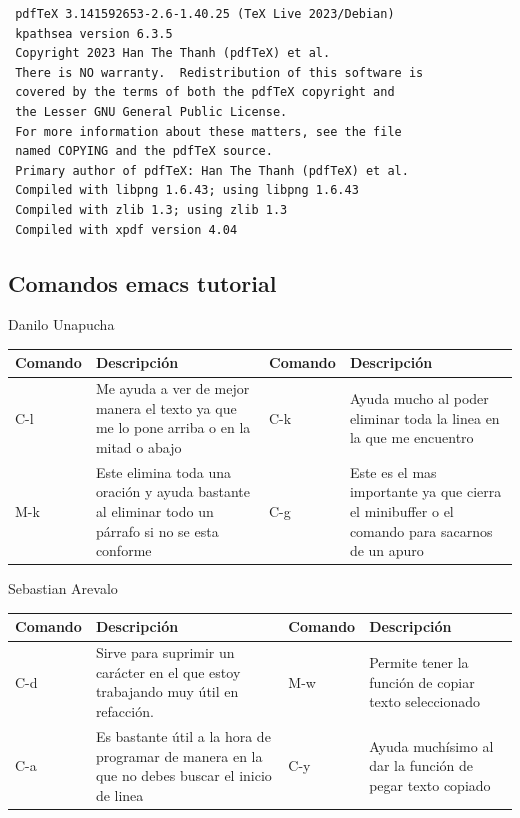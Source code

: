 \documentclass[11pt]{article}
\begin{document}
\begin{enumerate}
\begin{verbatim}
 pdfTeX 3.141592653-2.6-1.40.25 (TeX Live 2023/Debian)
 kpathsea version 6.3.5
 Copyright 2023 Han The Thanh (pdfTeX) et al.
 There is NO warranty.  Redistribution of this software is
 covered by the terms of both the pdfTeX copyright and
 the Lesser GNU General Public License.
 For more information about these matters, see the file
 named COPYING and the pdfTeX source.
 Primary author of pdfTeX: Han The Thanh (pdfTeX) et al.
 Compiled with libpng 1.6.43; using libpng 1.6.43
 Compiled with zlib 1.3; using zlib 1.3
 Compiled with xpdf version 4.04
\end{verbatim}
\end{enumerate}

\subsection{Comandos emacs tutorial}
\label{sec:org5b925f7}
Danilo Unapucha
\begin{center}
\begin{tabular}{llll}
Comando & Descripción & Comando & Descripción\\[0pt]
\hline
C-l & Me ayuda a ver de mejor manera el texto ya que me lo pone arriba o en la mitad o abajo & C-k & Ayuda mucho al poder eliminar toda la linea en la que me encuentro\\[0pt]
M-k & Este elimina toda una oración y ayuda bastante al eliminar todo un párrafo si no se esta conforme & C-g & Este es el mas importante ya que cierra el minibuffer o el comando para sacarnos de un apuro\\[0pt]
\end{tabular}
\end{center}

Sebastian Arevalo
\begin{center}
\begin{tabular}{llll}
Comando & Descripción & Comando & Descripción\\[0pt]
\hline
C-d & Sirve para suprimir un carácter en el que estoy trabajando muy útil en refacción. & M-w & Permite tener la función de copiar texto seleccionado\\[0pt]
C-a & Es bastante útil a la hora de programar de manera en la que no debes buscar el inicio de linea & C-y & Ayuda muchísimo al dar la función de pegar texto copiado\\[0pt]
\end{tabular}
\end{center}
\end{document}
